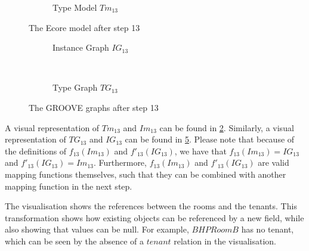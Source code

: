 \begin{figure}[p]
\begin{subfigure}{0.98\textwidth}
        \caption{Type Model $Tm_{13}$}
        \label{fig:application:building_the_model:room_tenant_relationship:ecore:type_model}
    \end{subfigure}
    \caption{The Ecore model after step 13}
    \label{fig:application:building_the_model:room_tenant_relationship:ecore}
\end{figure}

\begin{figure}[p]
    \centering
    \begin{subfigure}{0.98\textwidth}
        \centering
        
        \caption{Instance Graph $IG_{13}$}
        \label{fig:application:building_the_model:room_tenant_relationship:groove:instance_graph}
    \end{subfigure}
    \\
    \begin{subfigure}{0.98\textwidth}
        \centering
        
        \caption{Type Graph $TG_{13}$}
        \label{fig:application:building_the_model:room_tenant_relationship:groove:type_graph}
    \end{subfigure}
    \caption{The GROOVE graphs after step 13}
    \label{fig:application:building_the_model:room_tenant_relationship:groove}
\end{figure}

A visual representation of $Tm_{13}$ and $Im_{13}$ can be found in \cref{fig:application:building_the_model:room_tenant_relationship:ecore}. Similarly, a visual representation of $TG_{13}$ and $IG_{13}$ can be found in \cref{fig:application:building_the_model:room_tenant_relationship:groove}. Please note that because of the definitions of $f_{13}(Im_{13})$ and $f'_{13}(IG_{13})$, we have that $f_{13}(Im_{13}) = IG_{13}$ and $f'_{13}(IG_{13}) = Im_{13}$. Furthermore, $f_{13}(Im_{13})$ and $f'_{13}(IG_{13})$ are valid mapping functions themselves, such that they can be combined with another mapping function in the next step.

The visualisation shows the references between the rooms and the tenants. This transformation shows how existing objects can be referenced by a new field, while also showing that values can be null. For example, $BHPRoomB$ has no tenant, which can be seen by the absence of a $tenant$ relation in the visualisation.

\afterpage{\FloatBarrier}